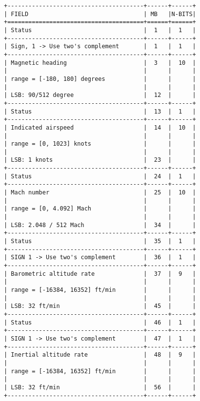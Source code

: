 \begin{verbatim}
+---------------------------------------+------+------+
| FIELD                                 | MB   |N-BITS|
+=======================================+======+======+
| Status                                |  1   |  1   |
+---------------------------------------+------+------+
| Sign, 1 -> Use two's complement       |  1   |  1   |
+---------------------------------------+------+------+
| Magnetic heading                      |  3   |  10  |
|                                       |      |      |
| range = [-180, 180] degrees           |      |      |
|                                       |      |      |
| LSB: 90/512 degree                    |  12  |      |
+---------------------------------------+------+------+
| Status                                |  13  |  1   |
+---------------------------------------+------+------+
| Indicated airspeed                    |  14  |  10  |
|                                       |      |      |
| range = [0, 1023] knots               |      |      |
|                                       |      |      |
| LSB: 1 knots                          |  23  |      |
+---------------------------------------+------+------+
| Status                                |  24  |  1   |
+---------------------------------------+------+------+
| Mach number                           |  25  |  10  |
|                                       |      |      |
| range = [0, 4.092] Mach               |      |      |
|                                       |      |      |
| LSB: 2.048 / 512 Mach                 |  34  |      |
+---------------------------------------+------+------+
| Status                                |  35  |  1   |
+---------------------------------------+------+------+
| SIGN 1 -> Use two's complement        |  36  |  1   |
+---------------------------------------+------+------+
| Barometric altitude rate              |  37  |  9   |
|                                       |      |      |
| range = [-16384, 16352] ft/min        |      |      |
|                                       |      |      |
| LSB: 32 ft/min                        |  45  |      |
+---------------------------------------+------+------+
| Status                                |  46  |  1   |
+---------------------------------------+------+------+
| SIGN 1 -> Use two's complement        |  47  |  1   |
+---------------------------------------+------+------+
| Inertial altitude rate                |  48  |  9   |
|                                       |      |      |
| range = [-16384, 16352] ft/min        |      |      |
|                                       |      |      |
| LSB: 32 ft/min                        |  56  |      |
+---------------------------------------+------+------+
\end{verbatim}

